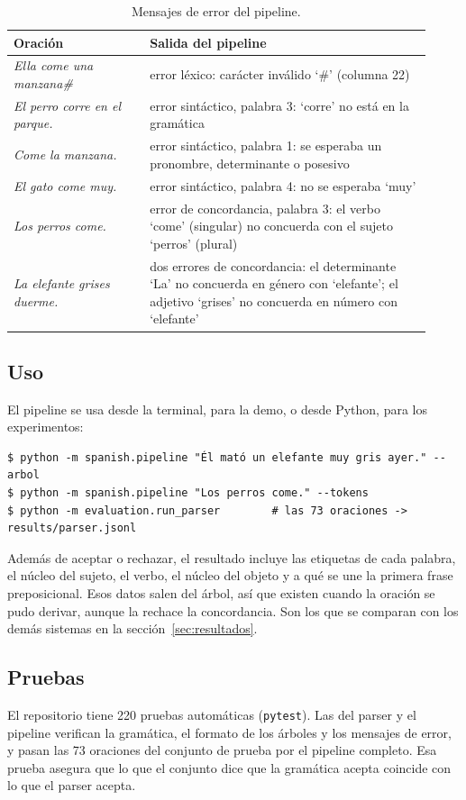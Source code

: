 \begin{table}[h]
  \centering
  \small
  \begin{tabular}{p{0.3\linewidth}p{0.62\linewidth}}
    \toprule
    Oración & Salida del pipeline \\
    \midrule
    \emph{Ella come una manzana\#} & error léxico: carácter inválido `\#' (columna 22) \\
    \emph{El perro corre en el parque.} & error sintáctico, palabra 3: `corre' no está en la gramática \\
    \emph{Come la manzana.} & error sintáctico, palabra 1: se esperaba un pronombre, determinante o posesivo \\
    \emph{El gato come muy.} & error sintáctico, palabra 4: no se esperaba `muy' \\
    \emph{Los perros come.} & error de concordancia, palabra 3: el verbo `come' (singular) no concuerda con el sujeto `perros' (plural) \\
    \emph{La elefante grises duerme.} & dos errores de concordancia: el determinante `La' no concuerda en género con `elefante'; el adjetivo `grises' no concuerda en número con `elefante' \\
    \bottomrule
  \end{tabular}
  \caption{Mensajes de error del pipeline.}
  \label{tab:errores_demo}
\end{table}

\subsection{Uso}

El pipeline se usa desde la terminal, para la demo, o desde Python, para los experimentos:
\begin{lstlisting}
$ python -m spanish.pipeline "Él mató un elefante muy gris ayer." --arbol
$ python -m spanish.pipeline "Los perros come." --tokens
$ python -m evaluation.run_parser        # las 73 oraciones -> results/parser.jsonl
\end{lstlisting}
Además de aceptar o rechazar, el resultado incluye las etiquetas de cada palabra, el núcleo del
sujeto, el verbo, el núcleo del objeto y a qué se une la primera frase preposicional. Esos datos
salen del árbol, así que existen cuando la oración se pudo derivar, aunque la rechace la
concordancia. Son los que se comparan con los demás sistemas en la
sección~\ref{sec:resultados}.

\subsection{Pruebas}

El repositorio tiene 220 pruebas automáticas (\texttt{pytest}). Las del parser y el pipeline
verifican la gramática, el formato de los árboles y los mensajes de error, y pasan las 73
oraciones del conjunto de prueba por el pipeline completo. Esa prueba asegura que lo que el
conjunto dice que la gramática acepta coincide con lo que el parser acepta.
